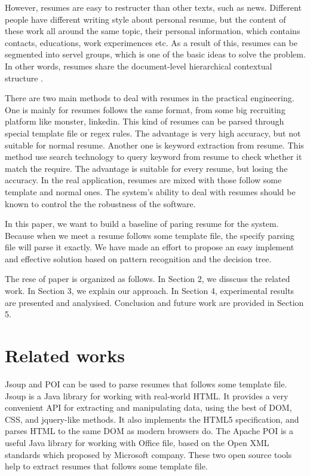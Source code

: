 \documentclass{acm_proc_article-sp}
\begin{document}
However, resumes are easy to restructer than other texts, such as news. 
Different people have different writing style about personal resume, but the content of these work all around the same topic, their personal information, which contains contacts, educations, work experimences etc.
As a result of this, resumes can be segmented into servel groups, which is one of the basic ideas to solve the problem.
In other words, resumes share the document-level hierarchical contextual structure \cite{maheshwari2010approach}.

There are two main methods to deal with resumes in the practical engineering. 
One is mainly for resumes follows the same format, from some big recruiting platform like monster, linkedin.
This kind of resumes can be parsed through special template file or regex rules.
The advantage is very high accuracy, but not suitable for normal resume.
Another one is keyword extraction from resume.
This method use search technology to query keyword from resume to check whether it match the require.
The advantage is suitable for every resume, but losing the accuracy.
In the real application, resumes are mixed with those follow some template and normal ones.
The system's ability to deal with resumes should be known to control the the robustness of the software.

In this paper, we want to build a baseline of paring resume for the system. 
Because when we meet a resume follows some template file, the specify parsing file will parse it exactly. 
We have made an effort to propose an easy implement and effective solution based on pattern recognition and the decision tree.

The rese of paper is organized as follows. In Section 2, we disscuss the related work. In Section 3, we explain our approach. In Section 4, experimental results are presented and analysised. Conclusion and future work are provided in Section 5.

\section{Related works}

Jsoup \cite{jsoup} and POI \cite{poi} can be used to parse resumes that follows some template file.
Jsoup is a Java library for working with real-world HTML. 
It provides a very convenient API for extracting and manipulating data, using the best of DOM, CSS, and jquery-like methods.
It also implements the HTML5 specification, and parses HTML to the same DOM as modern browsers do.
The Apache POI is a useful Java library for working with Office file, based on the Open XML standards which proposed by Microsoft company.
These two open source tools help to extract resumes that follows some template file.
\end{document}
